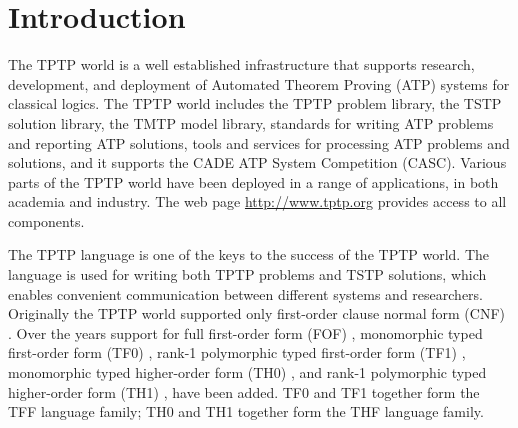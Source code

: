 \documentclass{easychair}
\begin{document}
\renewcommand{\implies}{\Rightarrow}
\newcommand{\liff}{\Leftrightarrow}
\newcommand{\lniff}{\not\Leftrightarrow}
\newcommand{\bool}{\mathit{bool}}

\section{Introduction}
\label{Introduction}

The TPTP world \cite{Sut10} is a well established infrastructure that supports
research, development, and deployment of Automated Theorem Proving (ATP)
systems for classical logics.
The TPTP world includes the TPTP problem library,
the TSTP solution library,
the TMTP model library,
standards for writing ATP problems and reporting ATP solutions,
tools and services for processing ATP problems and solutions,
and it supports the CADE ATP System Competition (CASC).
Various parts of the TPTP world have been deployed in a range of applications,
in both academia and industry.
The web page \url{http://www.tptp.org} provides access to all components.

The TPTP language is one of the keys to the success of the TPTP world.
The language is used for writing both TPTP problems and TSTP solutions,
which enables convenient communication between different systems and
researchers.
Originally the TPTP world supported only first-order clause normal form (CNF)
\cite{SS98-JAR}.
Over the years support for full first-order form (FOF) \cite{Sut09},
monomorphic typed first-order form (TF0) \cite{SS+12}, rank-1 polymorphic
typed first-order form (TF1) \cite{BP13-TFF1}, monomorphic typed higher-order 
form (TH0) \cite{SB10}, and rank-1 polymorphic typed higher-order form (TH1) 
\cite{KSR16}, have been added.
TF0 and TF1 together form the TFF language family; TH0 and TH1 together form 
the THF language family.
\end{document}
